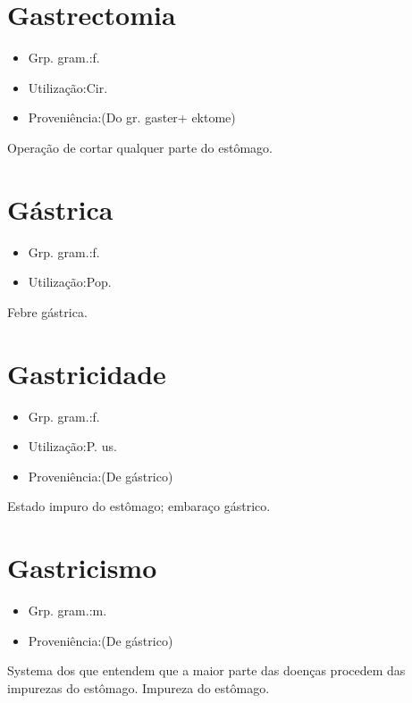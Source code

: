 \section{Gastrectomia}
\begin{itemize}
\item {Grp. gram.:f.}
\end{itemize}
\begin{itemize}
\item {Utilização:Cir.}
\end{itemize}
\begin{itemize}
\item {Proveniência:(Do gr. \textunderscore gaster\textunderscore  + \textunderscore ektome\textunderscore )}
\end{itemize}
Operação de cortar qualquer parte do estômago.
\section{Gástrica}
\begin{itemize}
\item {Grp. gram.:f.}
\end{itemize}
\begin{itemize}
\item {Utilização:Pop.}
\end{itemize}
Febre gástrica.
\section{Gastricidade}
\begin{itemize}
\item {Grp. gram.:f.}
\end{itemize}
\begin{itemize}
\item {Utilização:P. us.}
\end{itemize}
\begin{itemize}
\item {Proveniência:(De \textunderscore gástrico\textunderscore )}
\end{itemize}
Estado impuro do estômago; embaraço gástrico.
\section{Gastricismo}
\begin{itemize}
\item {Grp. gram.:m.}
\end{itemize}
\begin{itemize}
\item {Proveniência:(De \textunderscore gástrico\textunderscore )}
\end{itemize}
Systema dos que entendem que a maior parte das doenças procedem das impurezas do estômago.
Impureza do estômago.
